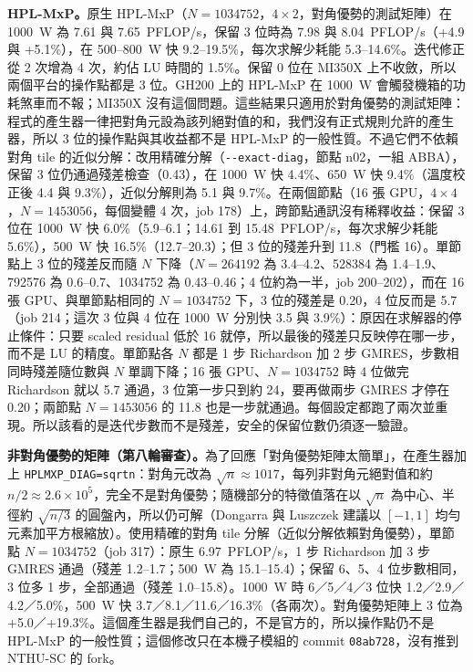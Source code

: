 \textbf{HPL-MxP。}原生 HPL-MxP（$N=1034752$，$4\times2$，對角優勢的測試矩陣）在 1000~W 為 7.61 與 7.65~PFLOP/s，保留 3 位時為 7.98 與 8.04~PFLOP/s（+4.9 與 +5.1\%），在 500–800~W 快 9.2–19.5\%，每次求解少耗能 5.3–14.6\%。迭代修正從 2 次增為 4 次，約佔 LU 時間的 1.5\%。保留 0 位在 MI350X 上不收斂，所以兩個平台的操作點都是 3 位。GH200 上的 HPL-MxP 在 1000~W 會觸發機箱的功耗煞車而不報；MI350X 沒有這個問題。這些結果只適用於對角優勢的測試矩陣：程式的產生器一律把對角元設為該列絕對值的和，我們沒有正式規則允許的產生器，所以 3 位的操作點與其收益都不是 HPL-MxP 的一般性質。不過它們不依賴對角 tile 的近似分解：改用精確分解（\texttt{-{}-exact-diag}，節點 n02，一組 ABBA），保留 3 位仍通過殘差檢查（0.43），在 1000~W 快 4.4\%、650~W 快 9.4\%（溫度校正後 4.4 與 9.3\%），近似分解則為 5.1 與 9.7\%。在兩個節點（16 張 GPU，$4\times4$，$N=1453056$，每個變體 4 次，job 178）上，跨節點通訊沒有稀釋收益：保留 3 位在 1000~W 快 6.0\%（5.9–6.1；14.61 到 15.48~PFLOP/s，每次求解少耗能 5.6\%），500~W 快 16.5\%（12.7–20.3）；但 3 位的殘差升到 11.8（門檻 16）。單節點上 3 位的殘差反而隨 $N$ 下降（$N=264192$ 為 3.4–4.2、528384 為 1.4–1.9、792576 為 0.6–0.7、1034752 為 0.43–0.46；4 位約為一半，job 200–202），而在 16 張 GPU、與單節點相同的 $N=1034752$ 下，3 位的殘差是 0.20，4 位反而是 5.7（job 214；這次 3 位與 4 位在 1000~W 分別快 3.5 與 3.9\%）：原因在求解器的停止條件：只要 scaled residual 低於 16 就停，所以最後的殘差只反映停在哪一步，而不是 LU 的精度。單節點各 $N$ 都是 1 步 Richardson 加 2 步 GMRES，步數相同時殘差隨位數與 $N$ 單調下降；16 張 GPU、$N=1034752$ 時 4 位做完 Richardson 就以 5.7 通過，3 位第一步只到約 24，要再做兩步 GMRES 才停在 0.20；兩節點 $N=1453056$ 的 11.8 也是一步就通過。每個設定都跑了兩次並重現。所以該看的是迭代步數而不是殘差，安全的保留位數仍須逐一驗證。

\textbf{非對角優勢的矩陣（第八輪審查）。}為了回應「對角優勢矩陣太簡單」，在產生器加上 \texttt{HPLMXP\_DIAG=sqrtn}：對角元改為 $\sqrt n\approx1017$，每列非對角元絕對值和約 $n/2\approx2.6\times10^5$，完全不是對角優勢；隨機部分的特徵值落在以 $\sqrt n$ 為中心、半徑約 $\sqrt{n/3}$ 的圓盤內，所以仍可解（Dongarra 與 Luszczek 建議以 $[-1,1]$ 均勻元素加平方根縮放）。使用精確的對角 tile 分解（近似分解依賴對角優勢），單節點 $N=1034752$（job 317）：原生 6.97~PFLOP/s，1 步 Richardson 加 3 步 GMRES 通過（殘差 1.2–1.7；500~W 為 15.1–15.4）；保留 6、5、4 位步數相同，3 位多 1 步，全部通過（殘差 1.0–15.8）。1000~W 時 6／5／4／3 位快 1.2／2.9／4.2／5.0\%，500~W 快 3.7／8.1／11.6／16.3\%（各兩次）。對角優勢矩陣上 3 位為 +5.0／+19.3\%。這個產生器是我們自己的，不是官方的，所以操作點仍不是 HPL-MxP 的一般性質；這個修改只在本機子模組的 commit \texttt{08ab728}，沒有推到 NTHU-SC 的 fork。


